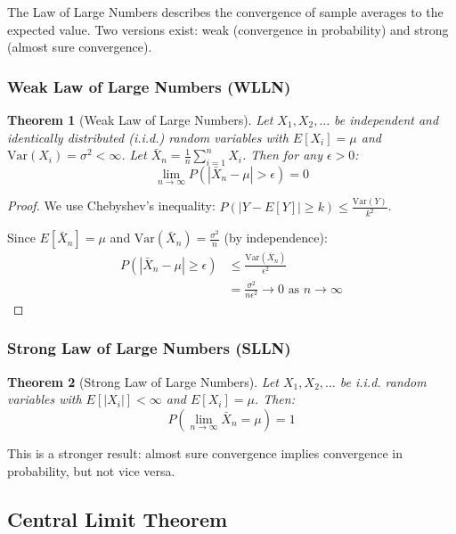 \documentclass[12pt,a4paper]{article}
\newtheorem{theorem}{Theorem}
\begin{document}
The Law of Large Numbers describes the convergence of sample averages to the expected value. Two versions exist: weak (convergence in probability) and strong (almost sure convergence).

\subsubsection{Weak Law of Large Numbers (WLLN)}

\begin{theorem}[Weak Law of Large Numbers]
Let $X_1, X_2, \ldots$ be independent and identically distributed (i.i.d.) random variables with $E[X_i] = \mu$ and $\text{Var}(X_i) = \sigma^2 < \infty$. Let $\bar{X}_n = \frac{1}{n}\sum_{i=1}^n X_i$. Then for any $\epsilon > 0$:
\begin{equation}
\lim_{n\to\infty} P(|\bar{X}_n - \mu| > \epsilon) = 0
\end{equation}
\end{theorem}

\begin{proof}
We use Chebyshev's inequality: $P(|Y - E[Y]| \geq k) \leq \frac{\text{Var}(Y)}{k^2}$.

Since $E[\bar{X}_n] = \mu$ and $\text{Var}(\bar{X}_n) = \frac{\sigma^2}{n}$ (by independence):
\begin{align*}
P(|\bar{X}_n - \mu| \geq \epsilon) &\leq \frac{\text{Var}(\bar{X}_n)}{\epsilon^2} \\
&= \frac{\sigma^2}{n\epsilon^2} \to 0 \text{ as } n\to\infty
\end{align*}
\end{proof}

\subsubsection{Strong Law of Large Numbers (SLLN)}

\begin{theorem}[Strong Law of Large Numbers]
Let $X_1, X_2, \ldots$ be i.i.d. random variables with $E[|X_i|] < \infty$ and $E[X_i] = \mu$. Then:
\begin{equation}
P\left(\lim_{n\to\infty} \bar{X}_n = \mu\right) = 1
\end{equation}
\end{theorem}

This is a stronger result: almost sure convergence implies convergence in probability, but not vice versa.

\subsection{Central Limit Theorem}
\end{document}
